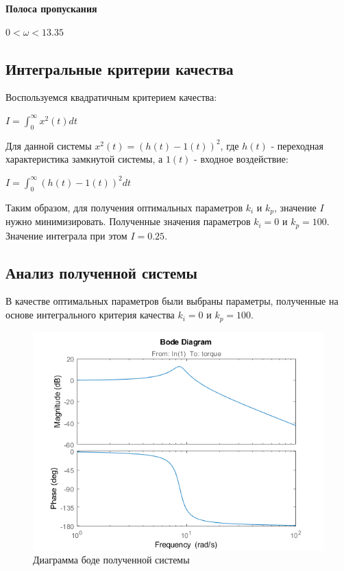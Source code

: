 \textbf{Полоса пропускания}

$0 < \omega < 13.35$


\subsection{Интегральные критерии качества}

Воспользуемся квадратичным критерием качества:

$I=\int_{0}^{\infty}x^2(t)dt$

Для данной системы $x^2(t)=(h(t)-1(t))^2$, где $h(t)$ - переходная характеристика замкнутой системы, а $1(t)$ - входное воздействие:


$I=\int_{0}^{\infty}(h(t)-1(t))^2dt$

Таким образом, для получения оптимальных параметров $k_i$ и $k_p$, значение $I$  нужно минимизировать. Полученные значения параметров $k_i = 0$ и $k_p = 100$. Значение интеграла при этом $I = 0.25$. 

\subsection{Анализ полученной системы}

В качестве оптимальных параметров были выбраны параметры, полученные на основе
интегрального критерия качества  $k_i = 0$ и $k_p = 100$.

\begin{figure}[h!]
	\centering
	\includegraphics[scale = 0.70]{images/bode.png}
	\caption{Диаграмма боде полученной системы}
	\label{image:9}
\end{figure}

